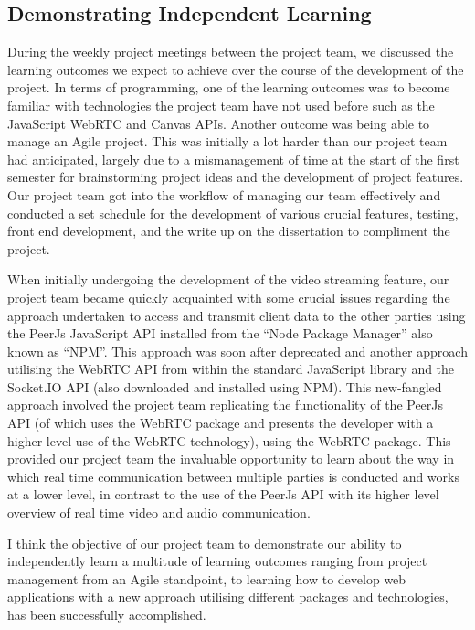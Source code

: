 \subsection{Demonstrating Independent Learning}
During the weekly project meetings between the project team, we discussed the learning outcomes we expect to achieve over the course of the development of the project. In terms of programming, one of the learning outcomes was to become familiar with technologies the project team have not used before such as the JavaScript WebRTC and Canvas APIs. Another outcome was being able to manage an Agile project. This was initially a lot harder than our project team had anticipated, largely due to a mismanagement of time at the start of the first semester for brainstorming project ideas and the development of project features. Our project team got into the workflow of managing our team effectively and conducted a set schedule for the development of various crucial features, testing, front end development, and the write up on the dissertation to compliment the project.

When initially undergoing the development of the video streaming feature, our project team became quickly acquainted with some crucial issues regarding the approach undertaken to access and transmit client data to the other parties using the PeerJs JavaScript API installed from the “Node Package Manager” also known as “NPM”. This approach was soon after deprecated and another approach utilising the WebRTC API from within the standard JavaScript library and the Socket.IO API (also downloaded and installed using NPM). This new-fangled approach involved the project team replicating the functionality of the PeerJs API (of which uses the WebRTC package and presents the developer with a higher-level use of the WebRTC technology), using the WebRTC package. This provided our project team the invaluable opportunity to learn about the way in which real time communication between multiple parties is conducted and works at a lower level, in contrast to the use of the PeerJs API with its higher level overview of real time video and audio communication.

I think the objective of our project team to demonstrate our ability to independently learn a multitude of learning outcomes ranging from project management from an Agile standpoint, to learning how to develop web applications with a new approach utilising different packages and technologies, has been successfully accomplished.


